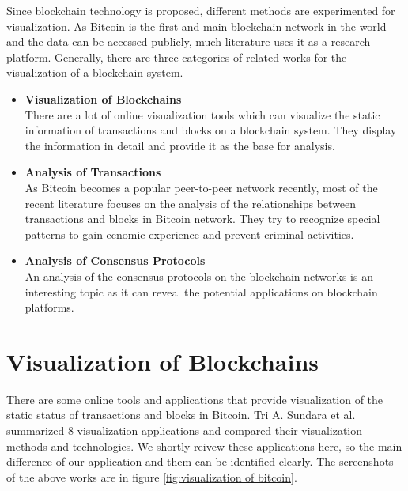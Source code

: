 Since blockchain technology is proposed, different methods are experimented for visualization. As Bitcoin is the first and main blockchain network in the world and the data can be accessed publicly, much literature uses it as a research platform. Generally, there are three categories of related works for the visualization of a blockchain system.
\begin{itemize}
    \item \textbf{Visualization of Blockchains} \\
        There are a lot of online visualization tools which can visualize the static information of transactions and blocks on a blockchain system. They display the information in detail and provide it as the base for analysis.
    \item \textbf{Analysis of Transactions} \\
        As Bitcoin becomes a popular peer-to-peer network recently, most of the recent literature focuses on the analysis of the relationships between transactions and blocks in Bitcoin network. They try to recognize special patterns to gain ecnomic experience and prevent criminal activities.
    \item \textbf{Analysis of Consensus Protocols} \\
        An analysis of the consensus protocols on the blockchain networks is an interesting topic as it can reveal the potential applications on blockchain platforms.
\end{itemize}

\section{Visualization of Blockchains}

There are some online tools and applications that provide visualization of the static status of transactions and blocks in Bitcoin. Tri A. Sundara et al. \cite{Sundara2017} summarized 8 visualization applications and compared their visualization methods and technologies. We shortly reivew these applications here, so the main difference of our application and them can be identified clearly. The screenshots of the above works are in figure \ref{fig:visualization of bitcoin}.

